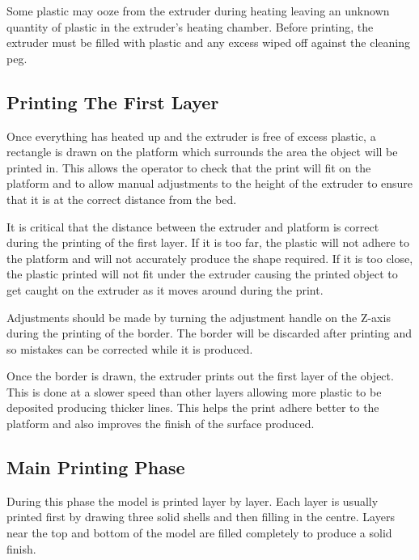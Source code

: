 			
			Some plastic may ooze from the extruder during heating leaving an unknown
			quantity of plastic in the extruder's heating chamber. Before printing,
			the extruder must be filled with plastic and any excess wiped off against
			the cleaning peg.
			
		
		\subsection{Printing The First Layer}
			
			Once everything has heated up and the extruder is free of excess plastic,
			a rectangle is drawn on the platform which surrounds the area the object
			will be printed in. This allows the operator to check that the print will
			fit on the platform and to allow manual adjustments to the height of the
			extruder to ensure that it is at the correct distance from the bed.
			
			It is critical that the distance between the extruder and platform is
			correct during the printing of the first layer. If it is too far, the
			plastic will not adhere to the platform and will not accurately produce
			the shape required. If it is too close, the plastic printed will not fit
			under the extruder causing the printed object to get caught on the
			extruder as it moves around during the print.
			
			Adjustments should be made by turning the adjustment handle on the Z-axis
			during the printing of the border. The border will be discarded after
			printing and so mistakes can be corrected while it is produced.
			
			Once the border is drawn, the extruder prints out the first layer of the
			object. This is done at a slower speed than other layers allowing more
			plastic to be deposited producing thicker lines. This helps the print
			adhere better to the platform and also improves the finish of the surface
			produced.
			
			
		\subsection{Main Printing Phase}
			
			During this phase the model is printed layer by layer. Each layer is
			usually printed first by drawing three solid shells and then filling in
			the centre. Layers near the top and bottom of the model are filled
			completely to produce a solid finish.
			
